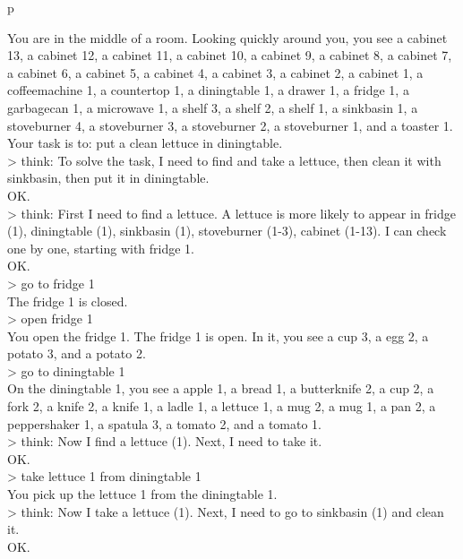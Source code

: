 \begin{table}[H]
\scriptsize
\begin{minipage}{0.9\linewidth}

\caption{An \model{} prompt on the ALFWorld clean task.}
\label{prompt:alfworld_im}
\centering
\ttfamily
\begin{tabular}{p\linewidth}
\midrule

You are in the middle of a room. Looking quickly around you, you see a cabinet 13, a cabinet 12, a cabinet 11, a cabinet 10, a cabinet 9, a cabinet 8, a cabinet 7, a cabinet 6, a cabinet 5, a cabinet 4, a cabinet 3, a cabinet 2, a cabinet 1, a coffeemachine 1, a countertop 1, a diningtable 1, a drawer 1, a fridge 1, a garbagecan 1, a microwave 1, a shelf 3, a shelf 2, a shelf 1, a sinkbasin 1, a stoveburner 4, a stoveburner 3, a stoveburner 2, a stoveburner 1, and a toaster 1.
Your task is to: put a clean lettuce in diningtable.\\
> think: To solve the task, I need to find and take a lettuce, then clean it with sinkbasin, then put it in diningtable. \\
OK.\\
> think: First I need to find a lettuce. A lettuce is more likely to appear in fridge (1), diningtable (1), sinkbasin (1), stoveburner (1-3), cabinet (1-13). I can check one by one, starting with fridge 1.\\
OK.\\
> go to fridge 1\\
The fridge 1 is closed.\\
> open fridge 1\\
You open the fridge 1. The fridge 1 is open. In it, you see a cup 3, a egg 2, a potato 3, and a potato 2.\\
> go to diningtable 1\\
On the diningtable 1, you see a apple 1, a bread 1, a butterknife 2, a cup 2, a fork 2, a knife 2, a knife 1, a ladle 1, a lettuce 1, a mug 2, a mug 1, a pan 2, a peppershaker 1, a spatula 3, a tomato 2, and a tomato 1.\\
> think: Now I find a lettuce (1). Next, I need to take it.\\
OK.\\
> take lettuce 1 from diningtable 1\\
You pick up the lettuce 1 from the diningtable 1.\\
> think: Now I take a lettuce (1). Next, I need to go to sinkbasin (1) and clean it.\\
OK.\\

\end{tabular}
\end{minipage}
\end{table}
